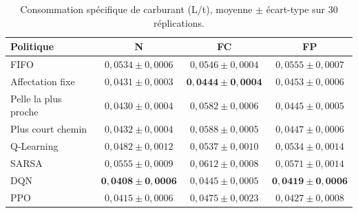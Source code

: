 \documentclass[11pt,a4paper]{article}
\newif\ifrevmarks
\newcommand{\revtag}[1]{\ifrevmarks\textsuperscript{\textcolor{red!70!black}{\scriptsize[#1]}}\fi}
\newcommand{\rev}[2]{\ifrevmarks{\color{revcolor}#2}\revtag{#1}\else#2\fi}
\begin{document}
\begin{table}[H]
\centering
\caption{\rev{M20, m16}{Consommation spécifique de carburant (L/t), moyenne $\pm$ écart-type sur 30 réplications.}}
\label{tab:fuel}
\footnotesize\setlength{\tabcolsep}{4pt}
\begin{tabular}{lccc}
\toprule
\textbf{Politique} & \textbf{N} & \textbf{FC} & \textbf{FP} \\
\midrule
FIFO                 & $0{,}0534\pm0{,}0006$ & $0{,}0546\pm0{,}0004$ & $0{,}0555\pm0{,}0007$ \\
Affectation fixe     & $0{,}0431\pm0{,}0003$ & $\mathbf{0{,}0444\pm0{,}0004}$ & $0{,}0453\pm0{,}0006$ \\
Pelle la plus proche & $0{,}0430\pm0{,}0004$ & $0{,}0582\pm0{,}0006$ & $0{,}0445\pm0{,}0005$ \\
Plus court chemin    & $0{,}0432\pm0{,}0004$ & $0{,}0588\pm0{,}0005$ & $0{,}0447\pm0{,}0006$ \\
Q-Learning           & $0{,}0482\pm0{,}0012$ & $0{,}0537\pm0{,}0010$ & $0{,}0534\pm0{,}0014$ \\
SARSA                & $0{,}0555\pm0{,}0009$ & $0{,}0612\pm0{,}0008$ & $0{,}0571\pm0{,}0014$ \\
DQN                  & $\mathbf{0{,}0408\pm0{,}0006}$ & $0{,}0445\pm0{,}0005$ & $\mathbf{0{,}0419\pm0{,}0006}$ \\
PPO                  & $0{,}0415\pm0{,}0006$ & $0{,}0475\pm0{,}0023$ & $0{,}0427\pm0{,}0008$ \\
\bottomrule
\end{tabular}
\end{table}
\end{document}
